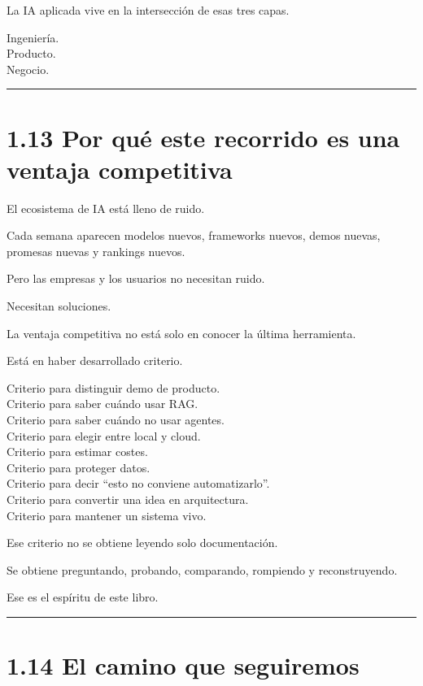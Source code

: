 La IA aplicada vive en la intersección de esas tres capas.

Ingeniería.\\
Producto.\\
Negocio.

\begin{center}\rule{0.5\linewidth}{0.5pt}\end{center}

\section{1.13 Por qué este recorrido es una ventaja
competitiva}\label{por-quuxe9-este-recorrido-es-una-ventaja-competitiva}

El ecosistema de IA está lleno de ruido.

Cada semana aparecen modelos nuevos, frameworks nuevos, demos nuevas,
promesas nuevas y rankings nuevos.

Pero las empresas y los usuarios no necesitan ruido.

Necesitan soluciones.

La ventaja competitiva no está solo en conocer la última herramienta.

Está en haber desarrollado criterio.

Criterio para distinguir demo de producto.\\
Criterio para saber cuándo usar RAG.\\
Criterio para saber cuándo no usar agentes.\\
Criterio para elegir entre local y cloud.\\
Criterio para estimar costes.\\
Criterio para proteger datos.\\
Criterio para decir ``esto no conviene automatizarlo''.\\
Criterio para convertir una idea en arquitectura.\\
Criterio para mantener un sistema vivo.

Ese criterio no se obtiene leyendo solo documentación.

Se obtiene preguntando, probando, comparando, rompiendo y
reconstruyendo.

Ese es el espíritu de este libro.

\begin{center}\rule{0.5\linewidth}{0.5pt}\end{center}

\section{1.14 El camino que seguiremos}\label{el-camino-que-seguiremos}

